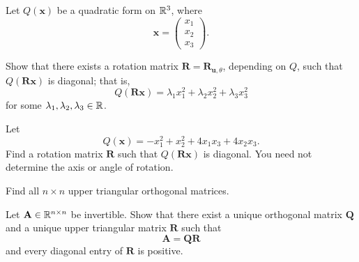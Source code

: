 \begin{problem}
Let $Q(\mathbf x)$ be a quadratic form on $\mathbb{R}^3$, where
\[
\mathbf x=
\begin{pmatrix}
x_1\\x_2\\x_3
\end{pmatrix}.
\]
\begin{problemsubparts}
\item Show that there exists a rotation matrix $\mathbf R=\mathbf R_{\mathbf u,\theta}$, depending on $Q$, such that $Q(\mathbf R\mathbf x)$ is diagonal; that is,
\[
Q(\mathbf R\mathbf x)=\lambda_1x_1^2+\lambda_2x_2^2+\lambda_3x_3^2
\]
for some $\lambda_1,\lambda_2,\lambda_3\in\mathbb{R}$.
\item Let
\[
Q(\mathbf x)=-x_1^2+x_2^2+4x_1x_3+4x_2x_3.
\]
Find a rotation matrix $\mathbf R$ such that $Q(\mathbf R\mathbf x)$ is diagonal. You need not determine the axis or angle of rotation.
\end{problemsubparts}
\end{problem}

\begin{problem}
Find all $n\times n$ upper triangular orthogonal matrices.
\end{problem}

\begin{problem}
Let $\mathbf A\in\mathbb{R}^{n\times n}$ be invertible. Show that there exist a unique orthogonal matrix $\mathbf Q$ and a unique upper triangular matrix $\mathbf R$ such that
\[
\mathbf A=\mathbf Q\mathbf R
\]
and every diagonal entry of $\mathbf R$ is positive.
\end{problem}

